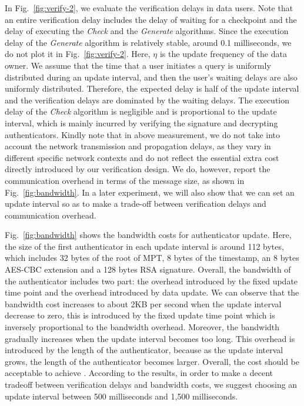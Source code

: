 In Fig.~\ref{fig:verify-2}, we evaluate the verification delays in data users. Note that an entire verification delay includes the delay of waiting for a checkpoint and the delay of executing the {\it Check} and the {\it Generate} algorithms. Since the execution delay of the {\it Generate} algorithm is relatively stable, around 0.1 milliseconds, we do not plot it in Fig.~\ref{fig:verify-2}. Here, $\eta$ is the update frequency of the data owner. We assume that the time that a user initiates a query is uniformly distributed during an update interval, and then the user's waiting delays are also uniformly distributed. Therefore, the expected delay is half of the update interval and the verification delays are dominated by the waiting delays. The execution delay of the {\it Check} algorithm is negligible and is proportional to the update interval, which is mainly incurred by verifying the signature and decrypting authenticators.
Kindly note that in above measurement, we do not take into account the network transmission and propagation delays, as they vary in different specific network contexts and do not reflect the essential extra cost directly introduced by our verification design. We do, however, report the communication overhead in terms of the message size, as shown in Fig.~\ref{fig:bandwidth}. In a later experiment, we will also show that we can set an update interval so as to make a trade-off between verification delays and communication overhead.

Fig.~\ref{fig:bandwidth} shows the bandwidth costs for authenticator update. %
Here, the size of the first authenticator in each update interval is around 112 bytes, which includes 32 bytes of the root of MPT, 8 bytes of the timestamp, an 8 bytes AES-CBC extension and a 128 bytes RSA signature. Overall, the bandwidth of the authenticator includes two part: the overhead introduced by the fixed update time point and the overhead introduced by data update. We can observe that the bandwidth cost increases to about 2KB per second when the update interval decrease to zero, this is introduced by the fixed update time point which is inversely proportional to the bandwidth overhead. Moreover, the bandwidth gradually increases when the update interval becomes too long. This overhead is introduced by the length of the authenticator, because as the update interval grows, the length of the authenticator becomes larger. Overall, the cost should be acceptable to achieve \multi. According to the results, in order to make a decent tradeoff between verification delays and bandwidth costs, we suggest choosing an update interval between 500 milliseconds and 1,500 milliseconds.

